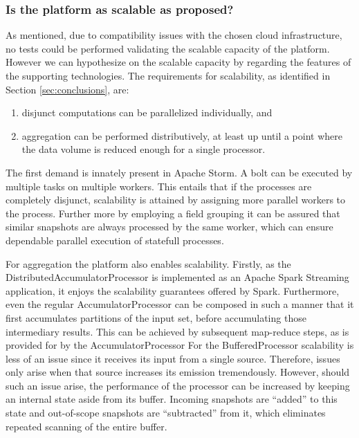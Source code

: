 \subsubsection{Is the platform as scalable as proposed?}
As mentioned, due to compatibility issues with the chosen cloud infrastructure, no tests could be performed validating the scalable capacity of the platform. However we can hypothesize on the scalable capacity by regarding the features of the supporting technologies. The requirements for scalability, as identified in Section \ref{sec:conclusions}, are:
\begin{enumerate}
\nospace
\item disjunct computations can be parallelized individually, and
\item aggregation can be performed distributively, at least up until a point where the data volume is reduced enough for a single processor.
\end{enumerate}
The first demand is innately present in Apache Storm. A bolt can be executed by multiple tasks on multiple workers. This entails that if the processes are completely disjunct, scalability is attained by assigning more parallel workers to the process. Further more by employing a field grouping it can be assured that similar snapshots are always processed by the same worker, which can ensure dependable parallel execution of statefull processes.

For aggregation the platform also enables scalability. Firstly, as the DistributedAccumulatorProcessor is implemented as an Apache Spark Streaming application, it enjoys the scalability guarantees offered by Spark. Furthermore, even the regular AccumulatorProcessor can be composed in such a manner that it first accumulates partitions of the input set, before accumulating those intermediary results. This can be achieved by subsequent map-reduce steps, as is provided for by the AccumulatorProcessor For the BufferedProcessor scalability is less of an issue since it receives its input from a single source. Therefore, issues only arise when that source increases its emission tremendously. However, should such an issue arise, the performance of the processor can be increased by keeping an internal state aside from its buffer. Incoming snapshots are ``added'' to this state and out-of-scope snapshots are ``subtracted'' from it, which eliminates repeated scanning of the entire buffer.

